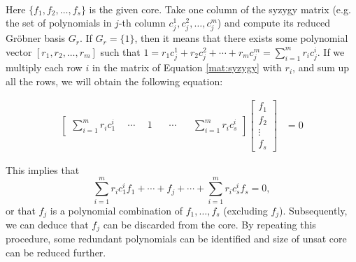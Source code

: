\ \\
 Here $\{f_1,f_2,\dots,f_s\}$ is the given core.
 Take one column of the syzygy matrix (e.g. the set of polynomials in $j$-th column
 $c_j^1, c_j^2, \dots, c_j^m$)  and compute its reduced Gr\"obner
 basis $G_r$. If $G_r = \{1\}$, then it means that there exists some
 polynomial vector  $[r_1,r_2,\dots,r_m]$ such that $1 = r_1c_j^1 +
 r_2c_j^2 + \cdots + r_mc_j^m = \sum_{i=1}^m r_ic_j^i.$ 
 If we multiply each row $i$ in the matrix of Equation \ref{mat:syzygy}
 with $r_i$, and sum up all the rows, we will obtain the
 following equation: 
\vspace{-0.2in}
 \begin{center}
\begin{align}
   \begin{bmatrix}
           \sum_{i=1}^m r_ic_1^i & ~~\cdots & ~~ 1 ~~ & ~~ \cdots ~~ & ~~\sum_{i=1}^m r_ic_s^i
         \end{bmatrix}
    \begin{bmatrix}
           f_{1} \\
           f_{2} \\
           \vdots \\
           f_{s}
         \end{bmatrix}
         &= 0
  \end{align}

\end{center}

This implies that 
 $$\sum_{i=1}^m r_ic_1^if_1 + \cdots + f_j
 +\cdots + \sum_{i=1}^m r_ic_s^if_s = 0,$$
or that $f_j$ is a polynomial combination of
$f_1,\dots,f_s$ (excluding $f_j$). Subsequently, we can deduce that $f_j$ can be
discarded from the core. By repeating this procedure, some redundant
polynomials can be identified and size of unsat core can be reduced
further. 


